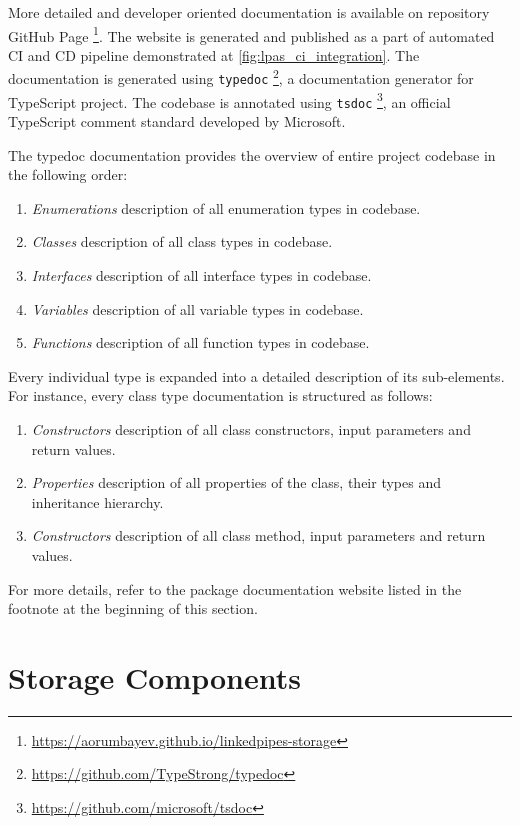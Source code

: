 More detailed and developer oriented documentation is available on repository GitHub Page \footnote{\url{https://aorumbayev.github.io/linkedpipes-storage}}. The website is generated and published as a part of automated CI and CD pipeline demonstrated at \autoref{fig:lpas_ci_integration}. The documentation is generated using \texttt{typedoc} \footnote{\url{https://github.com/TypeStrong/typedoc}}, a documentation generator for TypeScript project. The codebase is annotated using \texttt{tsdoc} \footnote{\url{https://github.com/microsoft/tsdoc}}, an official TypeScript comment standard developed by Microsoft.

The typedoc documentation provides the overview of entire \lpas{} project codebase in the following order:
\begin{enumerate}
    \item \textit{Enumerations} description of all enumeration types in codebase.
    \item \textit{Classes} description of all class types in codebase.
    \item \textit{Interfaces} description of all interface types in codebase.
    \item \textit{Variables} description of all variable types in codebase.
    \item \textit{Functions} description of all function types in codebase.
\end{enumerate}

Every individual type is expanded into a detailed description of its sub-elements. For instance, every class type documentation is structured as follows:
\begin{enumerate}
    \item \textit{Constructors} description of all class constructors, input parameters and return values.
    \item \textit{Properties} description of all properties of the class, their types and inheritance hierarchy.
    \item \textit{Constructors} description of all class method, input parameters and return values.
\end{enumerate}

For more details, refer to the package documentation website listed in the footnote at the beginning of this section.

\section{Storage Components}

